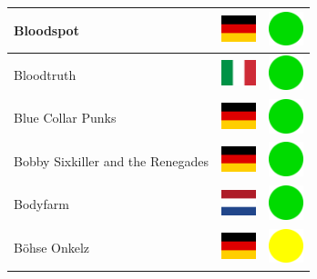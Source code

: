 \documentclass[12pt, a4paper, twoside]{report}
\begin{document}
\begin{center}
\begin{longtable}{|p{5cm}|p{2cm}|p{2cm}|}
Bloodspot & \includegraphics[width=1cm]{4x3/de} & \includegraphics[width=1cm]{likes/y} \\ \hline
Bloodtruth & \includegraphics[width=1cm]{4x3/it} & \includegraphics[width=1cm]{likes/y} \\ \hline
Blue Collar Punks & \includegraphics[width=1cm]{4x3/de} & \includegraphics[width=1cm]{likes/y} \\ \hline
Bobby Sixkiller and the Renegades & \includegraphics[width=1cm]{4x3/de} & \includegraphics[width=1cm]{likes/y} \\ \hline
Bodyfarm & \includegraphics[width=1cm]{4x3/nl} & \includegraphics[width=1cm]{likes/y} \\ \hline
Böhse Onkelz & \includegraphics[width=1cm]{4x3/de} & \includegraphics[width=1cm]{likes/m} \\ \hline

\end{longtable}
\end{center}
\end{document}
